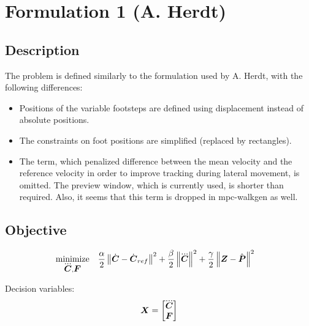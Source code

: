 \section{Formulation 1 (A. Herdt)}


\subsection{Description}
The problem is defined similarly to the formulation used by A. Herdt, with the following
differences:
\begin{itemize}
    \item Positions of the variable footsteps are defined using displacement instead
        of absolute positions.
    \item The constraints on foot positions are simplified (replaced by rectangles).
    \item The term, which penalized difference between the mean velocity and the reference
        velocity in order to improve tracking during lateral movement, is omitted.
        The preview window, which is currently used, is shorter than required. Also, it
        seems that this term is dropped in mpc-walkgen as well.
\end{itemize}



\subsection{Objective}
\begin{equation*}
\begin{split}
    \minimize{\cJerk, \FD}  & \frac{\alpha}{2} \norm{\cVel - \cVel_{ref}}^2 + 
                              \frac{\beta}{2}  \norm{\cJerk}^2 + 
                              \frac{\gamma}{2} \norm{\ZMP - \FPh}^2
\end{split}
\end{equation*}

Decision variables:
\begin{equation*}
\V{X} = 
\begin{bmatrix} 
    \cJerk \\ 
    \FD
\end{bmatrix}
\end{equation*}


